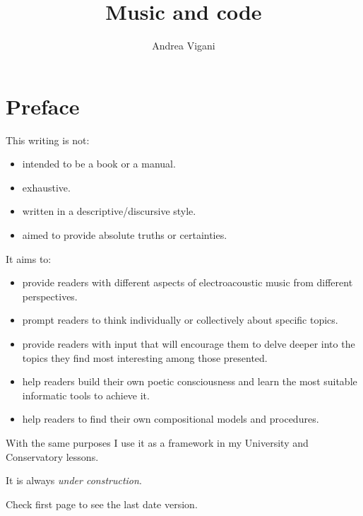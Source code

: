 \documentclass[a4paper,11pt]{book}
\providecommand{\tightlist}{\setlength{\itemsep}{0pt}
                               \setlength{\parskip}{0pt}}
\begin{document}
\author{Andrea Vigani}
\title{Music and code}
\maketitle


\chapter*{Preface}\label{prefazione}

This writing is not: 
\begin{itemize}
\tightlist\item intended to be a book or a manual.
\item exhaustive.
\item written in a descriptive/discursive style.
\item aimed to provide absolute truths or certainties.
\end{itemize}

It aims to:
\begin{itemize}
\tightlist\item provide readers with different aspects of electroacoustic music from different perspectives.
\item prompt readers to think individually or collectively about specific topics.
\item provide readers with input that will encourage them to delve deeper into the topics they find most interesting among those presented.
\item help readers build their own poetic consciousness and learn the most suitable informatic tools to achieve it.
\item help readers to find their own compositional models and procedures.
\end{itemize}

With the same purposes I use it as a framework in my University and Conservatory lessons.

It is always \textit{under construction}.

Check first page to see the last date version.

\tableofcontents



%
%
%
%
%
%
%
%
\begin{appendices}
%
%
\end{appendices}
\end{document}
